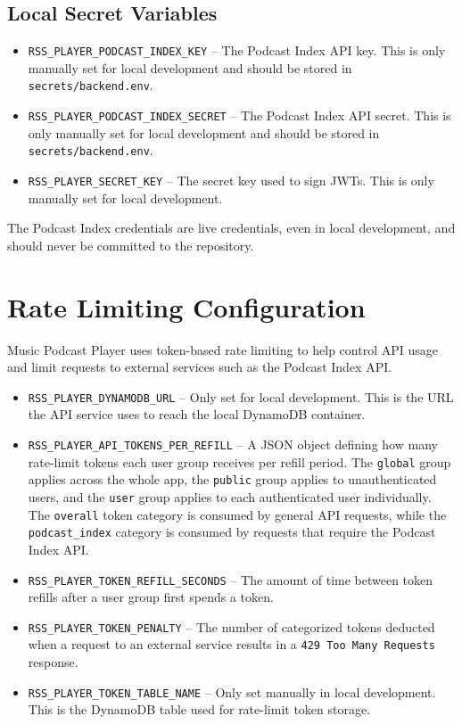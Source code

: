 \documentclass{article}
\begin{document}
\subsection{Local Secret Variables}
\begin{itemize}
    \item \texttt{RSS\_PLAYER\_PODCAST\_INDEX\_KEY} -- The Podcast Index API key. This is only manually set for local development and should be stored in \texttt{secrets/backend.env}.
    \item \texttt{RSS\_PLAYER\_PODCAST\_INDEX\_SECRET} -- The Podcast Index API secret. This is only manually set for local development and should be stored in \texttt{secrets/backend.env}.
    \item \texttt{RSS\_PLAYER\_SECRET\_KEY} -- The secret key used to sign JWTs. This is only manually set for local development.
\end{itemize}
The Podcast Index credentials are live credentials, even in local development, and should never be committed to the repository.

\section{Rate Limiting Configuration}
Music Podcast Player uses token-based rate limiting to help control API usage and limit requests to external services such as the Podcast Index API.
\begin{itemize}
    \item \texttt{RSS\_PLAYER\_DYNAMODB\_URL} -- Only set for local development. This is the URL the API service uses to reach the local DynamoDB container.
    \item \texttt{RSS\_PLAYER\_API\_TOKENS\_PER\_REFILL} -- A JSON object defining how many rate-limit tokens each user group receives per refill period. The \texttt{global} group applies across the whole app, the \texttt{public} group applies to unauthenticated users, and the \texttt{user} group applies to each authenticated user individually. The \texttt{overall} token category is consumed by general API requests, while the \texttt{podcast\_index} category is consumed by requests that require the Podcast Index API.
    \item \texttt{RSS\_PLAYER\_TOKEN\_REFILL\_SECONDS} -- The amount of time between token refills after a user group first spends a token.
    \item \texttt{RSS\_PLAYER\_TOKEN\_PENALTY} -- The number of categorized tokens deducted when a request to an external service results in a \texttt{429 Too Many Requests} response.
    \item \texttt{RSS\_PLAYER\_TOKEN\_TABLE\_NAME} -- Only set manually in local development. This is the DynamoDB table used for rate-limit token storage.
\end{itemize}
\end{document}
